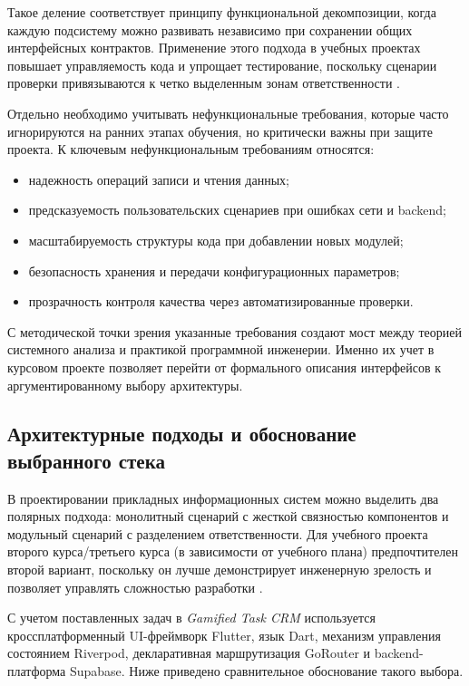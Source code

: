 Такое деление соответствует принципу функциональной декомпозиции, когда каждую подсистему можно развивать независимо при сохранении общих интерфейсных контрактов. Применение этого подхода в учебных проектах повышает управляемость кода и упрощает тестирование, поскольку сценарии проверки привязываются к четко выделенным зонам ответственности \cite{cleanArchitecture,patternsBook}.

Отдельно необходимо учитывать нефункциональные требования, которые часто игнорируются на ранних этапах обучения, но критически важны при защите проекта. К ключевым нефункциональным требованиям относятся:
\begin{itemize}
  \item надежность операций записи и чтения данных;
  \item предсказуемость пользовательских сценариев при ошибках сети и backend;
  \item масштабируемость структуры кода при добавлении новых модулей;
  \item безопасность хранения и передачи конфигурационных параметров;
  \item прозрачность контроля качества через автоматизированные проверки.
\end{itemize}

С методической точки зрения указанные требования создают мост между теорией системного анализа и практикой программной инженерии. Именно их учет в курсовом проекте позволяет перейти от формального описания интерфейсов к аргументированному выбору архитектуры.

\subsection{Архитектурные подходы и обоснование выбранного стека}

В проектировании прикладных информационных систем можно выделить два полярных подхода: монолитный сценарий с жесткой связностью компонентов и модульный сценарий с разделением ответственности. Для учебного проекта второго курса/третьего курса (в зависимости от учебного плана) предпочтителен второй вариант, поскольку он лучше демонстрирует инженерную зрелость и позволяет управлять сложностью разработки \cite{sommerville,designPatterns}.

С учетом поставленных задач в \textit{Gamified Task CRM} используется кроссплатформенный UI-фреймворк Flutter, язык Dart, механизм управления состоянием Riverpod, декларативная маршрутизация GoRouter и backend-платформа Supabase. Ниже приведено сравнительное обоснование такого выбора.

